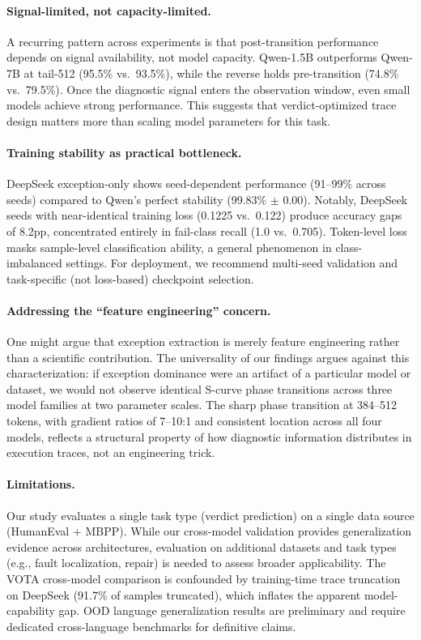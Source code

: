 \documentclass[11pt,a4paper]{article}
\begin{document}
\paragraph{Signal-limited, not capacity-limited.}
A recurring pattern across experiments is that post-transition performance depends on signal availability, not model capacity. Qwen-1.5B outperforms Qwen-7B at tail-512 (95.5\% vs.\ 93.5\%), while the reverse holds pre-transition (74.8\% vs.\ 79.5\%). Once the diagnostic signal enters the observation window, even small models achieve strong performance. This suggests that verdict-optimized trace design matters more than scaling model parameters for this task.

\paragraph{Training stability as practical bottleneck.}
DeepSeek exception-only shows seed-dependent performance (91--99\% across seeds) compared to Qwen's perfect stability (99.83\% $\pm$ 0.00). Notably, DeepSeek seeds with near-identical training loss (0.1225 vs.\ 0.122) produce accuracy gaps of 8.2pp, concentrated entirely in fail-class recall (1.0 vs.\ 0.705). Token-level loss masks sample-level classification ability, a general phenomenon in class-imbalanced settings. For deployment, we recommend multi-seed validation and task-specific (not loss-based) checkpoint selection.

\paragraph{Addressing the ``feature engineering'' concern.}
One might argue that exception extraction is merely feature engineering rather than a scientific contribution. The universality of our findings argues against this characterization: if exception dominance were an artifact of a particular model or dataset, we would not observe identical S-curve phase transitions across three model families at two parameter scales. The sharp phase transition at 384--512 tokens, with gradient ratios of 7--10:1 and consistent location across all four models, reflects a structural property of how diagnostic information distributes in execution traces, not an engineering trick.

\paragraph{Limitations.}
Our study evaluates a single task type (verdict prediction) on a single data source (HumanEval + MBPP). While our cross-model validation provides generalization evidence across architectures, evaluation on additional datasets and task types (e.g., fault localization, repair) is needed to assess broader applicability. The VOTA cross-model comparison is confounded by training-time trace truncation on DeepSeek (91.7\% of samples truncated), which inflates the apparent model-capability gap. OOD language generalization results are preliminary and require dedicated cross-language benchmarks for definitive claims.
\end{document}
